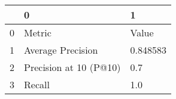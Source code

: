 \begin{tabular}{lll}
\toprule
{} &                       0 &         1 \\
\midrule
0 &                  Metric &     Value \\
1 &       Average Precision &  0.848583 \\
2 &  Precision at 10 (P@10) &       0.7 \\
3 &                  Recall &       1.0 \\
\bottomrule
\end{tabular}
